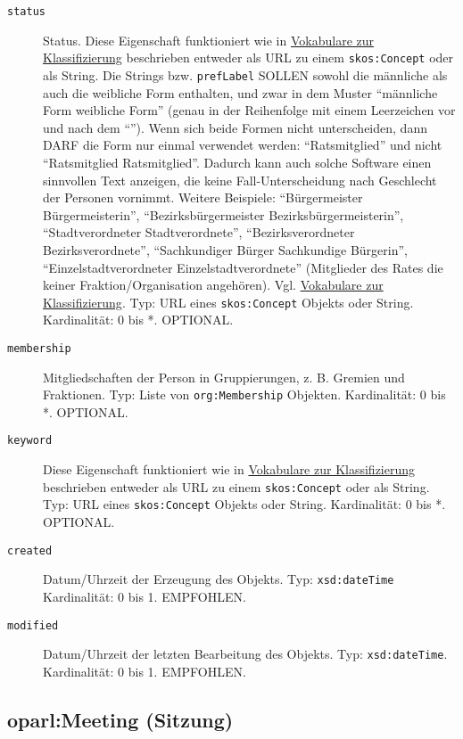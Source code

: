 \documentclass[,a4paper]{article}
\begin{document}
\begin{description}
\item[\texttt{status}]
Status. Diese Eigenschaft funktioniert wie in
\hyperref[vokabulareux5fklassifizierung]{Vokabulare zur Klassifizierung}
beschrieben entweder als URL zu einem \texttt{skos:Concept} oder als
String. Die Strings bzw. \texttt{prefLabel} SOLLEN sowohl die männliche
als auch die weibliche Form enthalten, und zwar in dem Muster
``männliche Form \textbar{} weibliche Form'' (genau in der Reihenfolge
mit einem Leerzeichen vor und nach dem ``\textbar{}''). Wenn sich beide
Formen nicht unterscheiden, dann DARF die Form nur einmal verwendet
werden: ``Ratsmitglied'' und nicht ``Ratsmitglied \textbar{}
Ratsmitglied''. Dadurch kann auch solche Software einen sinnvollen Text
anzeigen, die keine Fall-Unterscheidung nach Geschlecht der Personen
vornimmt. Weitere Beispiele: ``Bürgermeister \textbar{}
Bürgermeisterin'', ``Bezirksbürgermeister \textbar{}
Bezirksbürgermeisterin'', ``Stadtverordneter \textbar{}
Stadtverordnete'', ``Bezirksverordneter \textbar{} Bezirksverordnete'',
``Sachkundiger Bürger \textbar{} Sachkundige Bürgerin'',
``Einzelstadtverordneter \textbar{} Einzelstadtverordnete'' (Mitglieder
des Rates die keiner Fraktion/Organisation angehören). Vgl.
\hyperref[vokabulareux5fklassifizierung]{Vokabulare zur
Klassifizierung}. Typ: URL eines \texttt{skos:Concept} Objekts oder
String. Kardinalität: 0 bis *. OPTIONAL.
\item[\texttt{membership}]
Mitgliedschaften der Person in Gruppierungen, z. B. Gremien und
Fraktionen. Typ: Liste von \texttt{org:Membership} Objekten.
Kardinalität: 0 bis *. OPTIONAL.
\item[\texttt{keyword}]
Diese Eigenschaft funktioniert wie in
\hyperref[vokabulareux5fklassifizierung]{Vokabulare zur Klassifizierung}
beschrieben entweder als URL zu einem \texttt{skos:Concept} oder als
String. Typ: URL eines \texttt{skos:Concept} Objekts oder String.
Kardinalität: 0 bis *. OPTIONAL.
\item[\texttt{created}]
Datum/Uhrzeit der Erzeugung des Objekts. Typ: \texttt{xsd:dateTime}
Kardinalität: 0 bis 1. EMPFOHLEN.
\item[\texttt{modified}]
Datum/Uhrzeit der letzten Bearbeitung des Objekts. Typ:
\texttt{xsd:dateTime}. Kardinalität: 0 bis 1. EMPFOHLEN.
\end{description}

\subsection{oparl:Meeting (Sitzung)}\label{oparlux5fmeeting}
\end{document}
